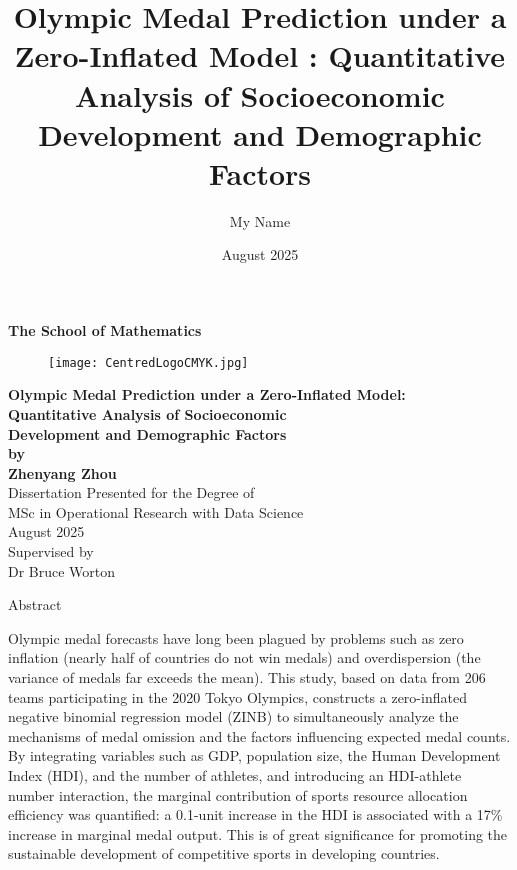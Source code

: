 \documentclass[11pt,twoside]{article}
\title{Olympic Medal Prediction under a Zero-Inflated Model : Quantitative Analysis of Socioeconomic Development and Demographic Factors}
\author{My Name}
\date{August 2025}
\numberwithin{Theorem}{section}
\numberwithin{Definition}{section}
\numberwithin{Lemma}{section}
\numberwithin{Algorithm}{section}
\numberwithin{equation}{section}
\begin{document}
\pagestyle{empty}

\begin{titlepage}
\vspace*{.5em}
\center
\textbf{\large{The School of Mathematics}} \\
\vspace*{1em}
\begin{figure}[!h]
\centering
\texttt{[image: CentredLogoCMYK.jpg]}
\end{figure}
\vspace{2em}
\textbf{\Huge{Olympic Medal Prediction under a Zero-Inflated Model:}} \\
\textbf{\Huge{Quantitative Analysis of Socioeconomic}} \\
\textbf{\Huge{Development and Demographic Factors}} \\[2em]
\textbf{\LARGE{by}}\\
\vspace{2em}
\textbf{\LARGE{Zhenyang Zhou}}\\
\vspace{6.5em}
\Large{Dissertation Presented for the Degree of\\
MSc in Operational Research with Data Science}\\
\vspace{6.5em}
\Large{August 2025}\\ 
\vspace{3em}
\Large{Supervised by\\Dr Bruce Worton}
\vfill
\end{titlepage}

\cleardoublepage

\begin{center}
\Large{Abstract}
\end{center}

Olympic medal forecasts have long been plagued by problems such as zero inflation (nearly half of countries do not win medals) and overdispersion (the variance of medals far exceeds the mean). This study, based on data from 206 teams participating in the 2020 Tokyo Olympics, constructs a zero-inflated negative binomial regression model (ZINB) to simultaneously analyze the mechanisms of medal omission and the factors influencing expected medal counts. By integrating variables such as GDP, population size, the Human Development Index (HDI), and the number of athletes, and introducing an HDI-athlete number interaction, the marginal contribution of sports resource allocation efficiency was quantified: a 0.1-unit increase in the HDI is associated with a 17\% increase in marginal medal output. This is of great significance for promoting the sustainable development of competitive sports in developing countries.
\end{document}
